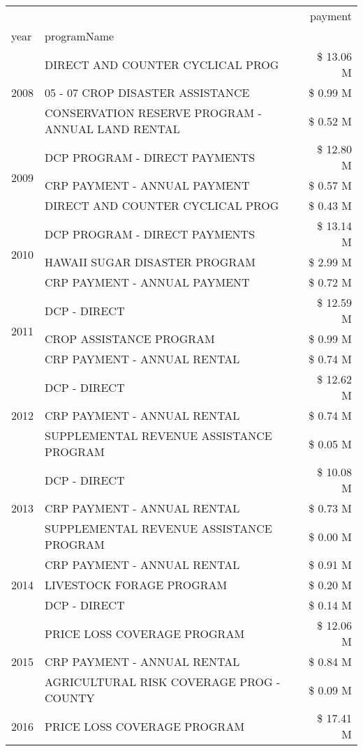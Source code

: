 \begin{tabular}{llr}
\toprule
 &  & payment \\
year & programName &  \\
\midrule
\multirow[t]{3}{*}{2008} & DIRECT AND COUNTER CYCLICAL PROG & \$ 13.06 M \\
 & 05 - 07 CROP DISASTER ASSISTANCE & \$ 0.99 M \\
 & CONSERVATION RESERVE PROGRAM - ANNUAL LAND RENTAL & \$ 0.52 M \\
\cline{1-3}
\multirow[t]{3}{*}{2009} & DCP PROGRAM - DIRECT PAYMENTS & \$ 12.80 M \\
 & CRP PAYMENT - ANNUAL PAYMENT & \$ 0.57 M \\
 & DIRECT AND COUNTER CYCLICAL PROG & \$ 0.43 M \\
\cline{1-3}
\multirow[t]{3}{*}{2010} & DCP PROGRAM - DIRECT PAYMENTS & \$ 13.14 M \\
 & HAWAII SUGAR DISASTER PROGRAM & \$ 2.99 M \\
 & CRP PAYMENT - ANNUAL PAYMENT & \$ 0.72 M \\
\cline{1-3}
\multirow[t]{3}{*}{2011} & DCP - DIRECT & \$ 12.59 M \\
 & CROP ASSISTANCE PROGRAM & \$ 0.99 M \\
 & CRP PAYMENT - ANNUAL RENTAL & \$ 0.74 M \\
\cline{1-3}
\multirow[t]{3}{*}{2012} & DCP - DIRECT & \$ 12.62 M \\
 & CRP PAYMENT - ANNUAL RENTAL & \$ 0.74 M \\
 & SUPPLEMENTAL REVENUE ASSISTANCE PROGRAM & \$ 0.05 M \\
\cline{1-3}
\multirow[t]{3}{*}{2013} & DCP - DIRECT & \$ 10.08 M \\
 & CRP PAYMENT - ANNUAL RENTAL & \$ 0.73 M \\
 & SUPPLEMENTAL REVENUE ASSISTANCE PROGRAM & \$ 0.00 M \\
\cline{1-3}
\multirow[t]{3}{*}{2014} & CRP PAYMENT - ANNUAL RENTAL & \$ 0.91 M \\
 & LIVESTOCK FORAGE PROGRAM & \$ 0.20 M \\
 & DCP - DIRECT & \$ 0.14 M \\
\cline{1-3}
\multirow[t]{3}{*}{2015} & PRICE LOSS COVERAGE PROGRAM & \$ 12.06 M \\
 & CRP PAYMENT - ANNUAL RENTAL & \$ 0.84 M \\
 & AGRICULTURAL RISK COVERAGE PROG - COUNTY & \$ 0.09 M \\
\cline{1-3}
\multirow[t]{3}{*}{2016} & PRICE LOSS COVERAGE PROGRAM                   & \$ 17.41 M \\

\end{tabular}
